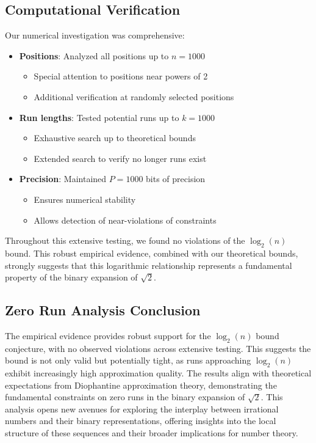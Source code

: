 \subsection{Computational Verification}
Our numerical investigation was comprehensive:
\begin{itemize}
    \item \textbf{Positions}: Analyzed all positions up to $n = 1000$
        \begin{itemize}
            \item Special attention to positions near powers of 2
            \item Additional verification at randomly selected positions
        \end{itemize}
    \item \textbf{Run lengths}: Tested potential runs up to $k = 1000$
        \begin{itemize}
            \item Exhaustive search up to theoretical bounds
            \item Extended search to verify no longer runs exist
        \end{itemize}
    \item \textbf{Precision}: Maintained $P = 1000$ bits of precision
        \begin{itemize}
            \item Ensures numerical stability
            \item Allows detection of near-violations of constraints
        \end{itemize}
\end{itemize}

Throughout this extensive testing, we found no violations of the $\log_2(n)$ bound. This robust empirical evidence, combined with our theoretical bounds, strongly suggests that this logarithmic relationship represents a fundamental property of the binary expansion of $\sqrt{2}$.

\subsection{Zero Run Analysis Conclusion}

The empirical evidence provides robust support for the $\log_2(n)$ bound conjecture, with no
observed violations across extensive testing. This suggests the bound is not only valid
but potentially tight, as runs approaching $\log_2(n)$ exhibit increasingly high approximation
quality. The results align with theoretical expectations from Diophantine approximation
theory, demonstrating the fundamental constraints on zero runs in the binary expansion of $\sqrt{2}$.
This analysis opens new avenues for exploring the interplay between irrational numbers
and their binary representations, offering insights into the local structure of these sequences
and their broader implications for number theory.